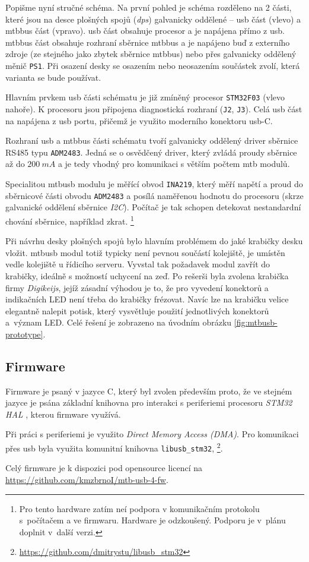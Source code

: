 Popišme nyní stručné schéma. Na první pohled je schéma rozděleno na 2 části,
které jsou na desce plošných spojů (\textit{\gls{dps}}) galvanicky oddělené –
\gls{usb} část (vlevo) a \gls{mtbbus} část (vpravo). \gls{usb} část obsahuje
procesor a je napájena přímo z \gls{usb}. \gls{mtbbus} část obsahuje rozhraní
sběrnice \gls{mtbbus} a je napájeno buď z externího zdroje (ze stejného jako
zbytek sběrnice \gls{mtbbus}) nebo přes galvanicky oddělený měnič \texttt{PS1}.
Při osazení desky se osazením nebo neosazením součástek zvolí, která varianta
se bude používat.

Hlavním prvkem \gls{usb} části schématu je již zmíněný procesor
\texttt{STM32F03} (vlevo nahoře). K procesoru jsou připojena diagnostická
rozhraní (\texttt{J2}, \texttt{J3}). Celá \gls{usb} část na napájena z \gls{usb}
portu, přičemž je využito moderního konektoru \gls{usb}-C.

Rozhraní \gls{usb} a \gls{mtbbus} části schématu tvoří galvanicky oddělený
driver sběrnice RS485 typu \texttt{ADM2483}. Jedná se o osvědčený driver,
který zvládá proudy sběrnice až do $200~mA$ \cite{adm2483-datasheet} a je tedy
vhodný pro komunikaci s větším počtem \gls{mtb} modulů.

Specialitou \gls{mtbusb} modulu je měřící obvod \texttt{INA219}, který měří
napětí a proud do sběrnicové části obvodu \texttt{ADM2483} a posílá naměřenou
hodnotu do procesoru (skrze galvanické oddělení sběrnice \textit{I2C}). Počítač
je tak schopen detekovat nestandardní chování sběrnice, například zkrat.
\footnote{Pro tento hardware zatím neí podpora v komunikačním protokolu
s~počítačem a ve firmwaru. Hardware je odzkoušený. Podporu je v~plánu doplnit
v~další verzi.}

Při návrhu desky plošných spojů bylo hlavním problémem do jaké krabičky desku
vložit. \gls{mtbusb} modul totiž typicky není pevnou součástí kolejiště, je
umístěn vedle kolejiště u řídicího serveru. Vyvstal tak požadavek modul zavřít
do krabičky, ideálně s možností uchycení na zeď. Po rešerši byla zvolena krabička
firmy \textit{Digikeijs}, jejíž zásadní výhodou je to, že pro vyvedení konektorů
a indikačních LED není třeba do krabičky frézovat. Navíc lze na krabičku velice
elegantně nalepit potisk, který vysvětluje použití jednotlivých konektorů
a~význam LED. Celé řešení je zobrazeno na úvodním obrázku
\ref{fig:mtbusb-prototype}.


\subsection{Firmware}

Firmware je psaný v jazyce C, který byl zvolen především proto, že ve stejném
jazyce je psána základní knihovna pro interakci s periferiemi procesoru
\textit{STM32 HAL} \cite{stm32-hal}, kterou firmware využívá.

Při práci s periferiemi je využito \textit{Direct Memory Access (DMA)}. Pro
komunikaci přes \gls{usb} byla využita komunitní knihovna \texttt{libusb\_stm32},
\footnote{\url{https://github.com/dmitrystu/libusb_stm32}}.

Celý firmware je k dispozici pod opensource licencí na
\url{https://github.com/kmzbrnoI/mtb-usb-4-fw}.
